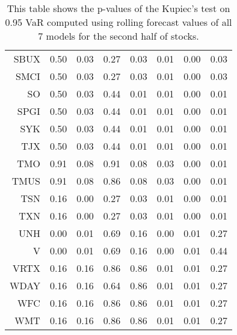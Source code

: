 \begin{table}[ht]
\begin{tabular}{rrrrrrrr}
  SBUX & 0.50 & 0.03 & 0.27 & 0.03 & 0.01 & 0.00 & 0.03 \\ 
  SMCI & 0.50 & 0.03 & 0.27 & 0.03 & 0.01 & 0.00 & 0.03 \\ 
  SO & 0.50 & 0.03 & 0.44 & 0.01 & 0.01 & 0.00 & 0.01 \\ 
  SPGI & 0.50 & 0.03 & 0.44 & 0.01 & 0.01 & 0.00 & 0.01 \\ 
  SYK & 0.50 & 0.03 & 0.44 & 0.01 & 0.01 & 0.00 & 0.01 \\ 
  TJX & 0.50 & 0.03 & 0.44 & 0.01 & 0.01 & 0.00 & 0.01 \\ 
  TMO & 0.91 & 0.08 & 0.91 & 0.08 & 0.03 & 0.00 & 0.01 \\ 
  TMUS & 0.91 & 0.08 & 0.86 & 0.08 & 0.03 & 0.00 & 0.01 \\ 
  TSN & 0.16 & 0.00 & 0.27 & 0.03 & 0.01 & 0.00 & 0.01 \\ 
  TXN & 0.16 & 0.00 & 0.27 & 0.03 & 0.01 & 0.00 & 0.01 \\ 
  UNH & 0.00 & 0.01 & 0.69 & 0.16 & 0.00 & 0.01 & 0.27 \\ 
  V & 0.00 & 0.01 & 0.69 & 0.16 & 0.00 & 0.01 & 0.44 \\ 
  VRTX & 0.16 & 0.16 & 0.86 & 0.86 & 0.01 & 0.01 & 0.27 \\ 
  WDAY & 0.16 & 0.16 & 0.64 & 0.86 & 0.01 & 0.01 & 0.27 \\ 
  WFC & 0.16 & 0.16 & 0.86 & 0.86 & 0.01 & 0.01 & 0.27 \\ 
  WMT & 0.16 & 0.16 & 0.86 & 0.86 & 0.01 & 0.01 & 0.27 \\ 
   \hline
\end{tabular}
\caption[Kupiec's test p-values, alpha =0.95 (2)]{This table shows the p-values of the Kupiec's test on 0.95 VaR computed using rolling forecast values of all 7 models for the second half of stocks.} 
\label{Table:Kupiec_test_rolling_0.95_2}
\end{table}
